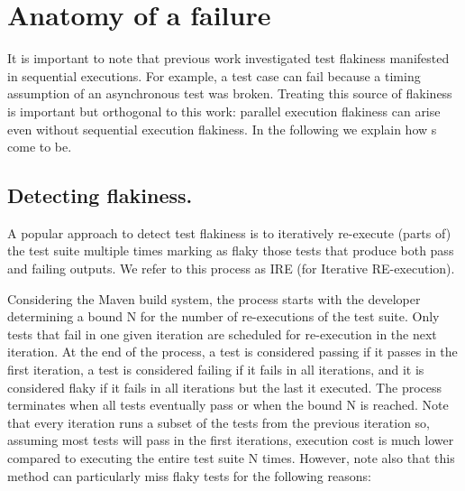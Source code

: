 \section{Anatomy of a \pef{} failure}

It is important to note that previous work investigated test flakiness
manifested in sequential executions.  For example, a
test case can fail because a timing assumption of an asynchronous test
was broken.  Treating this source of flakiness is important but
orthogonal to this work: parallel execution flakiness can arise even
without sequential execution flakiness.  In the following we explain
how \pef{}s come to be.


\subsection{Detecting flakiness.}
\label{sec:detect-flakiness-build}

A popular approach to detect test flakiness is to iteratively
re-execute (parts of) the test suite multiple times marking as flaky
those tests that produce both pass and failing outputs.  We refer to
this process as IRE (for Iterative RE-execution).

Considering the Maven build system, the process
starts with the developer determining a bound N for the number of
re-executions of the test suite.  Only tests that fail in one given
iteration are scheduled for re-execution in the next iteration.  At
the end of the process, a test is considered passing if it passes in
the first iteration, a test is considered failing if it fails in all
iterations, and it is considered flaky if it fails in all iterations
but the last it executed.  The process terminates when all tests
eventually pass or when the bound N is reached.  Note that every
iteration runs a subset of the tests from the previous iteration so,
assuming most tests will pass in the first iterations, execution cost
is much lower compared to executing the entire test suite N times.
However, note also that this method can particularly miss flaky tests
for the following reasons: 



